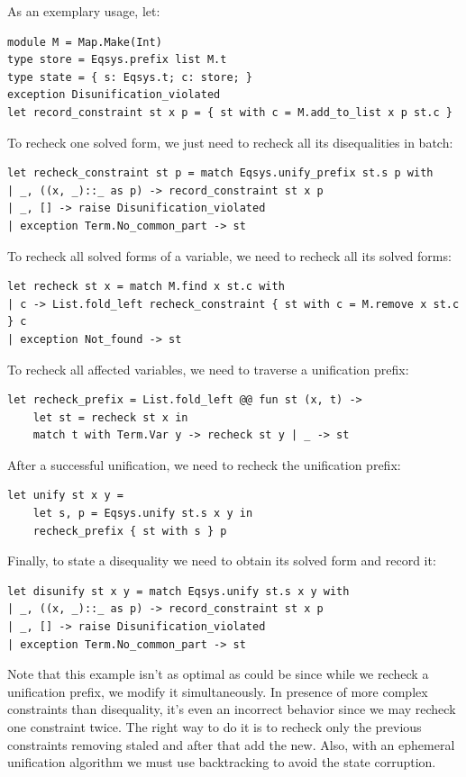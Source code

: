 As an exemplary usage, let:
\begin{verbatim}
module M = Map.Make(Int)
type store = Eqsys.prefix list M.t
type state = { s: Eqsys.t; c: store; }
exception Disunification_violated
let record_constraint st x p = { st with c = M.add_to_list x p st.c }
\end{verbatim}

To recheck one solved form, we just need to recheck all its disequalities in batch:
\begin{verbatim}
let recheck_constraint st p = match Eqsys.unify_prefix st.s p with
| _, ((x, _)::_ as p) -> record_constraint st x p
| _, [] -> raise Disunification_violated
| exception Term.No_common_part -> st
\end{verbatim}

To recheck all solved forms of a variable, we need to recheck all its solved forms:
\begin{verbatim}
let recheck st x = match M.find x st.c with
| c -> List.fold_left recheck_constraint { st with c = M.remove x st.c } c
| exception Not_found -> st
\end{verbatim}

To recheck all affected variables, we need to traverse a unification prefix:
\begin{verbatim}
let recheck_prefix = List.fold_left @@ fun st (x, t) ->
    let st = recheck st x in
    match t with Term.Var y -> recheck st y | _ -> st
\end{verbatim}

After a successful unification, we need to recheck the unification prefix:
\begin{verbatim}
let unify st x y =
    let s, p = Eqsys.unify st.s x y in
    recheck_prefix { st with s } p
\end{verbatim}

Finally, to state a disequality we need to obtain its solved form and record it:
\begin{verbatim}
let disunify st x y = match Eqsys.unify st.s x y with
| _, ((x, _)::_ as p) -> record_constraint st x p
| _, [] -> raise Disunification_violated
| exception Term.No_common_part -> st
\end{verbatim}

Note that this example isn't as optimal as could be since while we recheck a unification prefix, we modify it simultaneously. In presence of more complex constraints than disequality, it's even an incorrect behavior since we may recheck one constraint twice. The right way to do it is to recheck only the previous constraints removing staled and after that add the new. Also, with an ephemeral unification algorithm we must use backtracking to avoid the state corruption.

